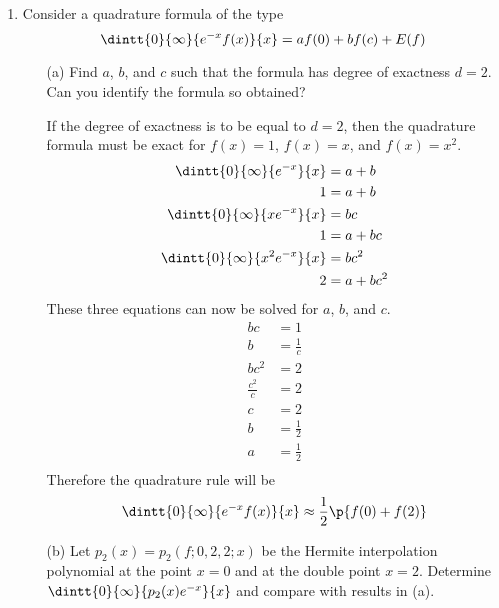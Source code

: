 \documentclass[11pt]{article}
\begin{document}
\begin{enumerate}
    \item %
        Consider a quadrature formula of the type
        \[
            \dintt{0}{\infty}{e^{-x} f(x)}{x} = a f(0) + b f(c) + E(f)
        \]
        \begin{enumerate}
            \item[(a)] %
                Find $a$, $b$, and $c$ such that the formula has degree
                of exactness $d = 2$.
                Can you identify the formula so obtained?

                If the degree of exactness is to be equal to $d=2$, then
                the quadrature formula must be exact for $f(x) = 1$, $f(x) = x$,
                and $f(x) = x^2$.
                \begin{align*}
                    \dintt{0}{\infty}{e^{-x}}{x} &= a + b \\
                    1 &= a + b \\
                    \dintt{0}{\infty}{x e^{-x}}{x} &= bc \\
                    1 &= a + bc \\
                    \dintt{0}{\infty}{x^2 e^{-x}}{x} &= bc^2 \\
                    2 &= a + bc^2
                \end{align*}
                These three equations can now be solved for $a$, $b$, and $c$.
                \begin{align*}
                    bc &= 1 \\
                    b &= \frac{1}{c} \\
                    bc^2 &= 2 \\
                    \frac{c^2}{c} &= 2 \\
                    c &= 2 \\
                    b &= \frac{1}{2} \\
                    a &= \frac{1}{2} \\
                \end{align*}
                Therefore the quadrature rule will be
                \[
                    \dintt{0}{\infty}{e^{-x} f(x)}{x} \approx \frac{1}{2}\p{f(0) + f(2)}
                \]

            \item[(b)] %
                Let $p_2(x) = p_2(f; 0, 2, 2; x)$ be the Hermite interpolation
                polynomial at the point $x = 0$ and at the double point $x = 2$.
                Determine $\dintt{0}{\infty}{p_2(x) e^{-x}}{x}$ and compare
                with results in (a).


\end{enumerate}
\end{enumerate}
\end{document}

